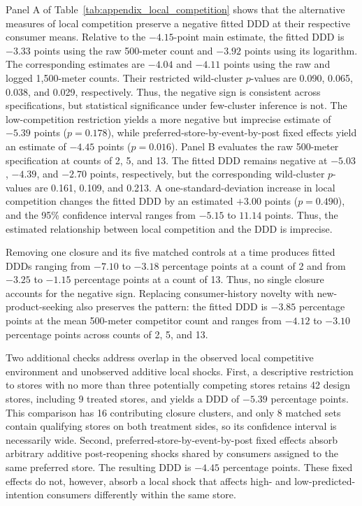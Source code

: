 \documentclass[11 pt]{article}
\begin{document}
Panel A of Table~\ref{tab:appendix_local_competition} shows that the alternative measures of local competition preserve a negative fitted DDD at their respective consumer means. Relative to the $-4.15$-point main estimate, the fitted DDD is $-3.33$ points using the raw 500-meter count and $-3.92$ points using its logarithm. The corresponding estimates are $-4.04$ and $-4.11$ points using the raw and logged 1,500-meter counts. Their restricted wild-cluster $p$-values are 0.090, 0.065, 0.038, and 0.029, respectively. Thus, the negative sign is consistent across specifications, but statistical significance under few-cluster inference is not. The low-competition restriction yields a more negative but imprecise estimate of $-5.39$ points ($p=0.178$), while preferred-store-by-event-by-post fixed effects yield an estimate of $-4.45$ points ($p=0.016$). Panel B evaluates the raw 500-meter specification at counts of 2, 5, and 13. The fitted DDD remains negative at $-5.03$, $-4.39$, and $-2.70$ points, respectively, but the corresponding wild-cluster $p$-values are 0.161, 0.109, and 0.213. A one-standard-deviation increase in local competition changes the fitted DDD by an estimated $+3.00$ points ($p=0.490$), and the 95\% confidence interval ranges from $-5.15$ to $11.14$ points. Thus, the estimated relationship between local competition and the DDD is imprecise.

Removing one closure and its five matched controls at a time produces fitted DDDs ranging from $-7.10$ to $-3.18$ percentage points at a count of 2 and from $-3.25$ to $-1.15$ percentage points at a count of 13. Thus, no single closure accounts for the negative sign. Replacing consumer-history novelty with new-product-seeking also preserves the pattern: the fitted DDD is $-3.85$ percentage points at the mean 500-meter competitor count and ranges from $-4.12$ to $-3.10$ percentage points across counts of 2, 5, and 13.

Two additional checks address overlap in the observed local competitive environment and unobserved additive local shocks. First, a descriptive restriction to stores with no more than three potentially competing stores retains 42 design stores, including 9 treated stores, and yields a DDD of $-5.39$ percentage points. This comparison has 16 contributing closure clusters, and only 8 matched sets contain qualifying stores on both treatment sides, so its confidence interval is necessarily wide. Second, preferred-store-by-event-by-post fixed effects absorb arbitrary additive post-reopening shocks shared by consumers assigned to the same preferred store. The resulting DDD is $-4.45$ percentage points. These fixed effects do not, however, absorb a local shock that affects high- and low-predicted-intention consumers differently within the same store.
\end{document}

